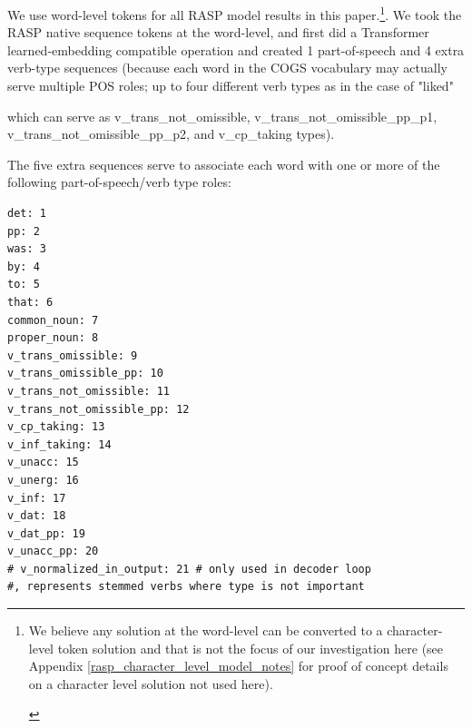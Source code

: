 \documentclass[11pt]{article}
\begin{document}
We use word-level tokens for all RASP model results in this paper.\footnote{\begin{footnotesize}We believe any solution at the word-level can be converted to a character-level token solution and that is not the focus of our investigation here (see Appendix \ref{rasp_character_level_model_notes} for proof of concept details on a character level solution not used here).\end{footnotesize}}. We took the RASP native sequence tokens at the word-level, and first did a Transformer learned-embedding compatible operation and created 1 part-of-speech and 4 extra verb-type sequences (because each word in the COGS vocabulary may actually serve multiple POS roles; up to four different verb types as in the case of "liked" 

which can serve as v\_trans\_not\_omissible, v\_trans\_not\_omissible\_pp\_p1, v\_trans\_not\_omissible\_pp\_p2, and v\_cp\_taking types). 

The five extra sequences serve to associate each word with one or more of the following part-of-speech/verb type roles:
\begin{tiny}
\begin{verbatim}
det: 1
pp: 2
was: 3
by: 4
to: 5
that: 6
common_noun: 7
proper_noun: 8
v_trans_omissible: 9
v_trans_omissible_pp: 10
v_trans_not_omissible: 11
v_trans_not_omissible_pp: 12
v_cp_taking: 13
v_inf_taking: 14
v_unacc: 15
v_unerg: 16
v_inf: 17
v_dat: 18
v_dat_pp: 19
v_unacc_pp: 20
# v_normalized_in_output: 21 # only used in decoder loop 
#, represents stemmed verbs where type is not important
\end{verbatim}
\end{tiny}
\end{document}
